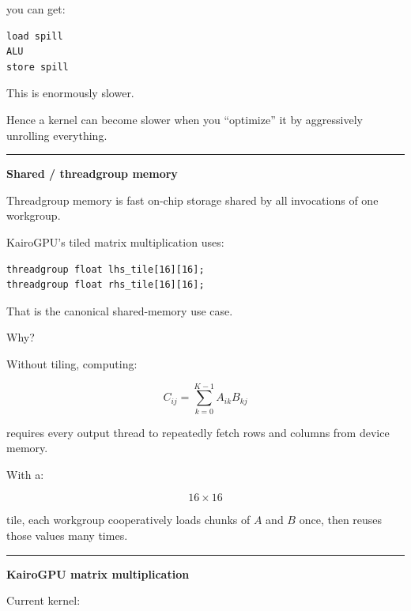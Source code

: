 you can get:

\protect{}\label{x9gdnc}%
\begin{verbatim}
load spill
ALU
store spill
\end{verbatim}

This is enormously slower.

Hence a kernel can become slower when you ``optimize'' it by aggressively unrolling everything.

\begin{center}\rule{0.5\linewidth}{0.5pt}\end{center}

\textbf{Shared / threadgroup memory}

Threadgroup memory is fast on-chip storage shared by all invocations of one workgroup.

KairoGPU's tiled matrix multiplication uses:

\protect{}\label{mmlugb}%
\begin{verbatim}
threadgroup float lhs_tile[16][16];
threadgroup float rhs_tile[16][16];
\end{verbatim}

That is the canonical shared-memory use case.

Why?

Without tiling, computing:

\[
C_{ij}
=
\sum_{k=0}^{K-1}
A_{ik}B_{kj}
\]

requires every output thread to repeatedly fetch rows and columns from device memory.

With a:

\[
16\times16
\]

tile, each workgroup cooperatively loads chunks of \(A\) and \(B\) once, then reuses those values many times.

\begin{center}\rule{0.5\linewidth}{0.5pt}\end{center}

\textbf{KairoGPU matrix multiplication}

Current kernel:

